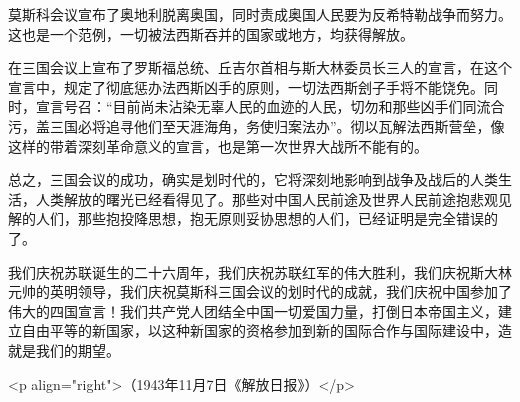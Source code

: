 莫斯科会议宣布了奥地利脱离奥国，同时责成奥国人民要为反希特勒战争而努力。这也是一个范例，一切被法西斯吞并的国家或地方，均获得解放。

在三国会议上宣布了罗斯福总统、丘吉尔首相与斯大林委员长三人的宣言，在这个宣言中，规定了彻底惩办法西斯凶手的原则，一切法西斯刽子手将不能饶免。同时，宣言号召：“目前尚未沾染无辜人民的血迹的人民，切勿和那些凶手们同流合污，盖三国必将追寻他们至天涯海角，务使归案法办”。彻以瓦解法西斯营垒，像这样的带着深刻革命意义的宣言，也是第一次世界大战所不能有的。

总之，三国会议的成功，确实是划时代的，它将深刻地影响到战争及战后的人类生活，人类解放的曙光已经看得见了。那些对中国人民前途及世界人民前途抱悲观见解的人们，那些抱投降思想，抱无原则妥协思想的人们，已经证明是完全错误的了。

我们庆祝苏联诞生的二十六周年，我们庆祝苏联红军的伟大胜利，我们庆祝斯大林元帅的英明领导，我们庆祝莫斯科三国会议的划时代的成就，我们庆祝中国参加了伟大的四国宣言！我们共产党人团结全中国一切爱国力量，打倒日本帝国主义，建立自由平等的新国家，以这种新国家的资格参加到新的国际合作与国际建设中，造就是我们的期望。

<p align="right">（1943年11月7日《解放日报》）</p>

